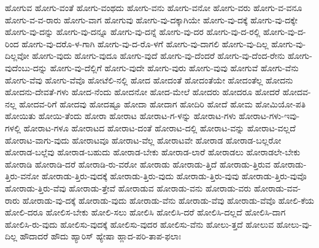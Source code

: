 {ಹೋಗುವ
ಹೋಗು-ವಂತೆ
ಹೋಗು-ವಂಥದು
ಹೋಗು-ವನು
ಹೋಗು-ವನೋ
ಹೋಗು-ವರು
ಹೋಗು-ವ-ವನೂ
ಹೋಗು-ವ-ವ-ರಾರು
ಹೋಗು-ವಾಗ
ಹೋಗುವು
ಹೋಗು-ವು-ದಕ್ಕಾಗಿಯೇ
ಹೋಗು-ವು-ದಕ್ಕೆ
ಹೋಗು-ವು-ದಕ್ಕೇ
ಹೋಗು-ವು-ದನ್ನು
ಹೋಗು-ವು-ದನ್ನೂ
ಹೋಗು-ವು-ದನ್ನೆ
ಹೋಗು-ವು-ದರ
ಹೋಗು-ವು-ದ-ರಲ್ಲಿ
ಹೋಗು-ವು-ದ-ರಿಂದ
ಹೋಗು-ವು-ದರೊ-ಳ-ಗಾಗಿ
ಹೋಗು-ವು-ದ-ರೊ-ಳಗೆ
ಹೋಗು-ವು-ದಾಗಲಿ
ಹೋಗು-ವು-ದಿಲ್ಲ
ಹೋಗು-ವು-ದಿಲ್ಲವೋ
ಹೋಗು-ವುದು
ಹೋಗು-ವುದೂ
ಹೋಗು-ವುದೆ
ಹೋಗು-ವು-ದೆಂದರೆ
ಹೋಗು-ವು-ದೆಂದ-ರೇನು
ಹೋಗು-ವುದೆಂಬು-ದನ್ನು
ಹೋಗು-ವು-ದೆಲ್ಲಿಗೆ
ಹೋಗು-ವುದೇ
ಹೋಗು-ವುರು
ಹೋಗು-ವುವು
ಹೋಗುವೆ
ಹೋಗು-ವೆನು
ಹೋಗು-ವೆವು
ಹೋಗು-ವೆವೊ
ಹೋಟೆಲಿ-ನಲ್ಲಿ
ಹೋದ
ಹೋದಂತೆ
ಹೋದಂತೆಯೇ
ಹೋದಂತೆಲ್ಲ
ಹೋದನು
ಹೋದನು-ದೇವತೆ-ಗಳು
ಹೋದ-ನೆಂದು
ಹೋದನೋ
ಹೋದ-ಮೇಲೆ
ಹೋದರು
ಹೋದರೂ
ಹೋದರೆ
ಹೋದವ-ನಲ್ಲ
ಹೋದವ-ರಿಗೆ
ಹೋದವು
ಹೋದಷ್ಟೂ
ಹೋದಾ
ಹೋದಾಗ
ಹೋದಿರಿ
ಹೋದೆ
ಹೋಮ
ಹೋಮಿಯೋ-ಪತಿ
ಹೋಯಿತು
ಹೋಯಿ-ತೆಂದು
ಹೋರಾ
ಹೋರಾಟ
ಹೋರಾಟ-ಗ-ಳನ್ನು
ಹೋರಾಟ-ಗಳು
ಹೋರಾಟ-ಗಳು-ಇವು-ಗಳಲ್ಲಿ
ಹೋರಾಟ-ಗಳೂ
ಹೋರಾಟದ
ಹೋರಾಟ-ದಂತೆ
ಹೋರಾಟ-ದಲ್ಲಿ
ಹೋರಾಟ-ವನ್ನು
ಹೋರಾಟ-ವಲ್ಲದೆ
ಹೋರಾಟ-ವಾಗು-ವುದು
ಹೋರಾಟವೂ
ಹೋರಾಟ-ವೆಲ್ಲ
ಹೋರಾಟವೇ
ಹೋರಾಡ
ಹೋರಾಡ-ಬಲ್ಲರೋ
ಹೋರಾಡ-ಬಲ್ಲೆವು
ಹೋರಾಡ-ಬಹುದು
ಹೋರಾಡ-ಬೇಕು
ಹೋರಾಡ-ಲಾರೆ
ಹೋರಾಡಲು
ಹೋರಾಡಲೇ-ಬೇಕು
ಹೋರಾಡಿ
ಹೋರಾಡಿ-ದರೆ
ಹೋರಾಡಿ-ರು-ವರೋ
ಹೋರಾಡು
ಹೋರಾಡು-ತ್ತಿದೆ
ಹೋರಾಡು-ತ್ತಿರುವ
ಹೋರಾಡು-ತ್ತಿರು-ವನೋ
ಹೋರಾಡು-ತ್ತಿರು-ವುದಕ್ಕೆ
ಹೋರಾಡು-ತ್ತಿರು-ವುದು
ಹೋರಾಡು-ತ್ತಿರು-ವುವು
ಹೋರಾಡು-ತ್ತಿರು-ವುವೊ
ಹೋರಾಡು-ತ್ತಿರು-ವೆವು
ಹೋರಾಡು-ತ್ತೇವೆ
ಹೋರಾಡುವ
ಹೋರಾಡು-ವನು
ಹೋರಾಡು-ವರು
ಹೋರಾಡು-ವವ-ರಾರು
ಹೋರಾಡು-ವು-ದಕ್ಕೆ
ಹೋರಾಡು-ವುದು
ಹೋರಾಡು-ವೆನು
ಹೋರಾಡು-ವೆವು
ಹೋರಾಡು-ವೆವೊ
ಹೋಲಿ-ಕೆಯ
ಹೋಲಿ-ದರೂ
ಹೋಲಿಸ-ಬೇಕು
ಹೋಲಿ-ಸಲು
ಹೋಲಿಸಿ
ಹೋಲಿಸಿ-ದರೆ
ಹೋಲಿಸಿ-ದಲ್ಲದೆ
ಹೋಲಿಸಿ-ದಾಗ
ಹೋಲಿಸಿ-ರು-ವುದು
ಹೋಲಿಸು-ವುದಕ್ಕೆ
ಹೋಲಿಸು-ವುದರ
ಹೋಲಿಸು-ವೆನು
ಹೋಲು-ತ್ತದೆ
ಹೋಲುವ
ಹೋಲು-ವು-ದಿಲ್ಲ
ಹೌದಾದರೆ
ಹೌದು
ಹ್ಯಾರಿಸ್
ಹ್ಯೇಷಾ
ಹ್ಲಾದ-ಪರಿ-ತಾಪ-ಫಲಾಃ
}
